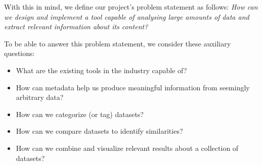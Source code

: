 With this in mind, we define our project's problem statement as follows:
\textit{How can we design and implement a tool capable of analysing large amounts of data and extract relevant
information about its content?}

To be able to answer this problem statement, we consider these auxiliary questions:
\begin{itemize}
    \item What are the existing tools in the industry capable of?
    \item How can metadata help us produce meaningful information from seemingly arbitrary data?
    \item How can we categorize (or tag) datasets?
    \item How can we compare datasets to identify similarities?
    \item How can we combine and visualize relevant results about a collection of datasets?
\end{itemize}